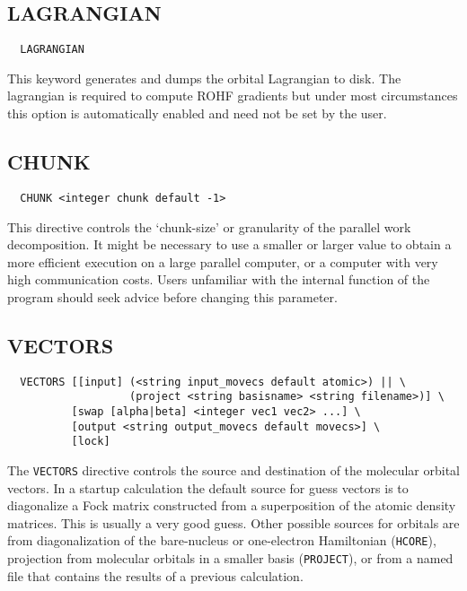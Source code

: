 \subsection{LAGRANGIAN}

\begin{verbatim}
  LAGRANGIAN
\end{verbatim}

This keyword generates and dumps the orbital Lagrangian to disk. The
lagrangian is required to compute ROHF gradients but under most
circumstances this option is automatically enabled and need not be set
by the user.

\subsection{CHUNK}

\begin{verbatim}
  CHUNK <integer chunk default -1>
\end{verbatim}

This directive controls the `chunk-size' or granularity of the
parallel work decomposition.  It might be necessary to use a smaller
or larger value to obtain a more efficient execution on a large
parallel computer, or a computer with very high communication costs.
Users unfamiliar with the internal function of the program should seek
advice before changing this parameter.

\subsection{VECTORS}
\label{sec:vectors}

\begin{verbatim}
  VECTORS [[input] (<string input_movecs default atomic>) || \
                   (project <string basisname> <string filename>)] \
          [swap [alpha|beta] <integer vec1 vec2> ...] \
          [output <string output_movecs default movecs>] \
          [lock]
\end{verbatim}

The \verb+VECTORS+ directive controls the source and destination of
the molecular orbital vectors.  In a startup calculation the default
source for guess vectors is to diagonalize a Fock matrix constructed
from a superposition of the atomic density matrices.  This is usually
a very good guess.  Other possible sources for orbitals are from
diagonalization of the bare-nucleus or one-electron Hamiltonian
(\verb+HCORE+), projection from molecular orbitals in a smaller basis
(\verb+PROJECT+), or from a named file that contains the results of a
previous calculation.

